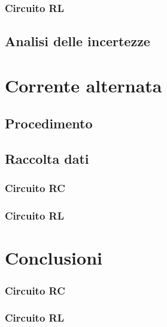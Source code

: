\subsubsection{Circuito RL}
\subsection{Analisi delle incertezze}


\section{Corrente alternata}
\subsection{Procedimento}
\subsection{Raccolta dati}
\subsubsection{Circuito RC}
\subsubsection{Circuito RL}

\section{Conclusioni}
\subsubsection{Circuito RC}
\subsubsection{Circuito RL}
